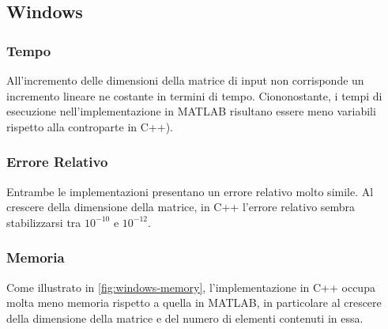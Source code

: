 \documentclass[11pt,italian]{article}
\begin{document}
\subsection{Windows}
\subsubsection*{Tempo}
All'incremento delle dimensioni della matrice di input non corrisponde un incremento lineare ne costante in termini di tempo.
Ciononostante, i tempi di esecuzione nell'implementazione in MATLAB risultano essere meno variabili rispetto alla controparte in C++).
\begin{figure}[H]
\end{figure}

\subsubsection*{Errore Relativo}
Entrambe le implementazioni presentano un errore relativo molto simile. Al crescere della dimensione della matrice, in C++ l'errore relativo sembra stabilizzarsi tra $10^{-10}$ e $10^{-12}$.
\begin{figure}[H]
\end{figure}

\subsubsection*{Memoria}
Come illustrato in \cref{fig:windows-memory}, l'implementazione in C++ occupa molta meno memoria rispetto a quella in MATLAB, in particolare al crescere della dimensione della matrice e del numero di elementi contenuti in essa.
\end{document}
